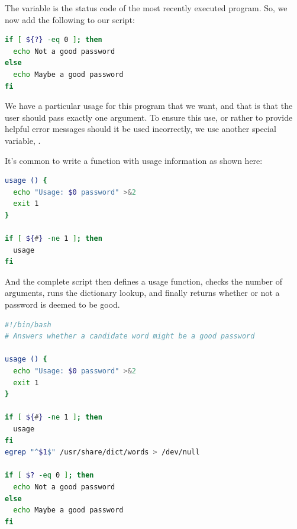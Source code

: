 \documentclass[english, 11pt]{article}
\begin{document}
  The variable  is the status code of the most recently executed program. So, we now add the following to our script:
  \begin{lstlisting}[language=bash]
if [ ${?} -eq 0 ]; then
  echo Not a good password
else
  echo Maybe a good password
fi
  \end{lstlisting}

  \begin{note} We have a particular usage for this program that we want, and that is that the user should pass exactly one argument. To ensure this use, or rather to provide helpful error messages should it be used incorrectly, we use another special variable, \tc{\$\#}.
    \end{note}

    It's common to write a function with usage information as shown here:
    \begin{lstlisting}[language=bash]
usage () {
  echo "Usage: $0 password" >&2
  exit 1
}

if [ ${#} -ne 1 ]; then
  usage
fi
    \end{lstlisting}

    And the complete script then defines a usage function, checks the number of arguments, runs the dictionary lookup, and finally returns whether or not a password is deemed to be good.
    \begin{lstlisting}[language=bash]
#!/bin/bash
# Answers whether a candidate word might be a good password

usage () {
  echo "Usage: $0 password" >&2
  exit 1
}

if [ ${#} -ne 1 ]; then
  usage
fi
egrep "^$1$" /usr/share/dict/words > /dev/null

if [ $? -eq 0 ]; then
  echo Not a good password
else
  echo Maybe a good password
fi
    \end{lstlisting}
\end{document}
